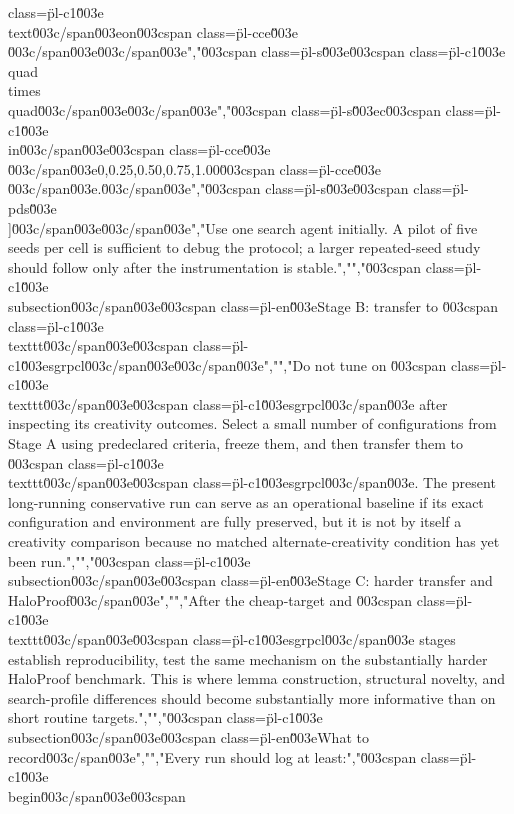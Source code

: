 {{{class=\"pl-c1\"\u003e\\text\u003c/span\u003e{on}\u003cspan class=\"pl-cce\"\u003e\\}\u003c/span\u003e\u003c/span\u003e","\u003cspan class=\"pl-s\"\u003e\u003cspan class=\"pl-c1\"\u003e\\quad\\times\\quad\u003c/span\u003e\u003c/span\u003e","\u003cspan class=\"pl-s\"\u003ec\u003cspan class=\"pl-c1\"\u003e\\in\u003c/span\u003e\u003cspan class=\"pl-cce\"\u003e\\{\u003c/span\u003e0,0.25,0.50,0.75,1.00\u003cspan class=\"pl-cce\"\u003e\\}\u003c/span\u003e.\u003c/span\u003e","\u003cspan class=\"pl-s\"\u003e\u003cspan class=\"pl-pds\"\u003e\\]\u003c/span\u003e\u003c/span\u003e","Use one search agent initially. A pilot of five seeds per cell is sufficient to debug the protocol; a larger repeated-seed study should follow only after the instrumentation is stable.","","\u003cspan class=\"pl-c1\"\u003e\\subsection\u003c/span\u003e{\u003cspan class=\"pl-en\"\u003eStage B: transfer to \u003cspan class=\"pl-c1\"\u003e\\texttt\u003c/span\u003e{\u003cspan class=\"pl-c1\"\u003esgrpcl\u003c/span\u003e}\u003c/span\u003e}","","Do not tune on \u003cspan class=\"pl-c1\"\u003e\\texttt\u003c/span\u003e{\u003cspan class=\"pl-c1\"\u003esgrpcl\u003c/span\u003e} after inspecting its creativity outcomes. Select a small number of configurations from Stage A using predeclared criteria, freeze them, and then transfer them to \u003cspan class=\"pl-c1\"\u003e\\texttt\u003c/span\u003e{\u003cspan class=\"pl-c1\"\u003esgrpcl\u003c/span\u003e}. The present long-running conservative run can serve as an operational baseline if its exact configuration and environment are fully preserved, but it is not by itself a creativity comparison because no matched alternate-creativity condition has yet been run.","","\u003cspan class=\"pl-c1\"\u003e\\subsection\u003c/span\u003e{\u003cspan class=\"pl-en\"\u003eStage C: harder transfer and HaloProof\u003c/span\u003e}","","After the cheap-target and \u003cspan class=\"pl-c1\"\u003e\\texttt\u003c/span\u003e{\u003cspan class=\"pl-c1\"\u003esgrpcl\u003c/span\u003e} stages establish reproducibility, test the same mechanism on the substantially harder HaloProof benchmark. This is where lemma construction, structural novelty, and search-profile differences should become substantially more informative than on short routine targets.","","\u003cspan class=\"pl-c1\"\u003e\\subsection\u003c/span\u003e{\u003cspan class=\"pl-en\"\u003eWhat to record\u003c/span\u003e}","","Every run should log at least:","\u003cspan class=\"pl-c1\"\u003e\\begin\u003c/span\u003e{\u003cspan }}}
